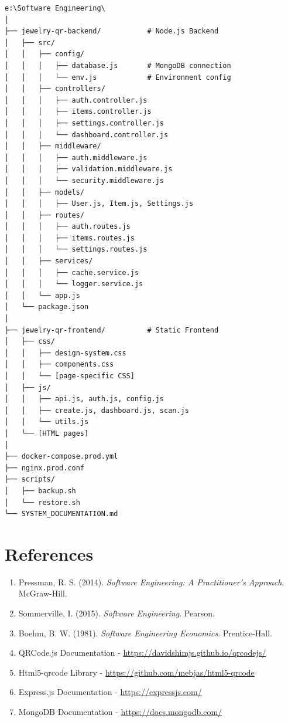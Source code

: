 \documentclass[12pt,a4paper]{article}
\begin{document}
\begin{verbatim}
e:\Software Engineering\
│
├── jewelry-qr-backend/           # Node.js Backend
│   ├── src/
│   │   ├── config/
│   │   │   ├── database.js       # MongoDB connection
│   │   │   └── env.js            # Environment config
│   │   ├── controllers/
│   │   │   ├── auth.controller.js
│   │   │   ├── items.controller.js
│   │   │   ├── settings.controller.js
│   │   │   └── dashboard.controller.js
│   │   ├── middleware/
│   │   │   ├── auth.middleware.js
│   │   │   ├── validation.middleware.js
│   │   │   └── security.middleware.js
│   │   ├── models/
│   │   │   ├── User.js, Item.js, Settings.js
│   │   ├── routes/
│   │   │   ├── auth.routes.js
│   │   │   ├── items.routes.js
│   │   │   └── settings.routes.js
│   │   ├── services/
│   │   │   ├── cache.service.js
│   │   │   └── logger.service.js
│   │   └── app.js
│   └── package.json
│
├── jewelry-qr-frontend/          # Static Frontend
│   ├── css/
│   │   ├── design-system.css
│   │   ├── components.css
│   │   └── [page-specific CSS]
│   ├── js/
│   │   ├── api.js, auth.js, config.js
│   │   ├── create.js, dashboard.js, scan.js
│   │   └── utils.js
│   └── [HTML pages]
│
├── docker-compose.prod.yml
├── nginx.prod.conf
├── scripts/
│   ├── backup.sh
│   └── restore.sh
└── SYSTEM_DOCUMENTATION.md
\end{verbatim}

\section{References}

\begin{enumerate}
    \item Pressman, R. S. (2014). \textit{Software Engineering: A Practitioner's Approach}. McGraw-Hill.
    \item Sommerville, I. (2015). \textit{Software Engineering}. Pearson.
    \item Boehm, B. W. (1981). \textit{Software Engineering Economics}. Prentice-Hall.
    \item QRCode.js Documentation - \url{https://davidshimjs.github.io/qrcodejs/}
    \item Html5-qrcode Library - \url{https://github.com/mebjas/html5-qrcode}
    \item Express.js Documentation - \url{https://expressjs.com/}
    \item MongoDB Documentation - \url{https://docs.mongodb.com/}
\end{enumerate}
\end{document}
